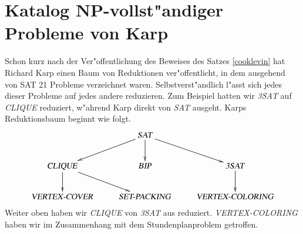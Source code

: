 %
%
%
%

\section{Katalog NP-vollst"andiger Probleme von Karp}
Schon kurz nach der Ver"offentlichung des Beweises des Satzes
\ref{cooklevin} hat Richard Karp einen Baum von Reduktionen
ver"offentlicht, in dem ausgehend von SAT 21 Probleme verzeichnet
waren.
Selbstverst"andlich l"asst
sich jedes dieser Probleme auf jedes andere reduzieren. Zum Beispiel
hatten wir \textsl{3SAT} auf \textsl{CLIQUE} reduziert, w"ahrend
Karp direkt von \textsl{SAT} ausgeht. Karps Reduktionsbaum
beginnt wie folgt.
\[
\xymatrix{
{}
	&\text{\textsl{SAT}} \ar[dl] \ar[d] \ar[dr]
\\
\text{\textsl{CLIQUE}} \ar[d] \ar[dr]
	&\text{\textsl{BIP}}
		&\text{\textsl{3SAT}} \ar[d]
\\
\text{\textsl{VERTEX-COVER}}
	&\text{\textsl{SET-PACKING}}
		&\text{\textsl{VERTEX-COLORING}}
}
\]
Weiter oben haben wir \textsl{CLIQUE} von \textsl{3SAT} aus
reduziert. \textsl{VERTEX-COLORING} haben wir im Zusammenhang
mit dem Stundenplanproblem getroffen.

